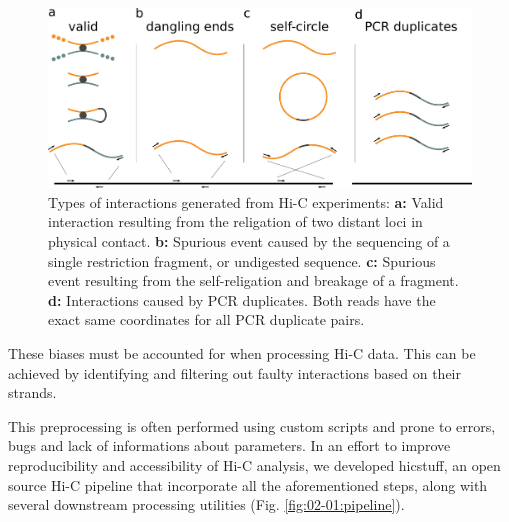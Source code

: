 \begin{figure}[htb]
    \includegraphics[width=\textwidth]{Parts/Part02/gfx/hicstuff/filters.pdf}
    \caption[Types of interactions generated from Hi-C experiments.]{Types of interactions generated from Hi-C experiments: \textbf{a:} Valid interaction resulting from the religation of two distant loci in physical contact. \textbf{b:} Spurious event caused by the sequencing of a single restriction fragment, or undigested sequence. \textbf{c:} Spurious event resulting from the self-religation and breakage of a fragment. \textbf{d:} Interactions caused by PCR duplicates. Both reads have the exact same coordinates for all PCR duplicate pairs.}
    \label{fig:02-01:filters}
\end{figure}

These biases must be accounted for when processing Hi-C data. This can be achieved by identifying and filtering out faulty interactions based on their strands.

This preprocessing is often performed using custom scripts and prone to errors, bugs and lack of informations about parameters. In an effort to improve reproducibility and accessibility of Hi-C analysis, we developed hicstuff, an open source Hi-C pipeline that incorporate all the aforementioned steps, along with several downstream processing utilities (Fig. \ref{fig:02-01:pipeline}).

